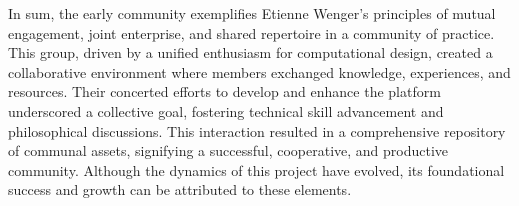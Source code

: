 In sum, the early community exemplifies Etienne Wenger’s principles of mutual engagement, joint enterprise, and shared repertoire in a community of practice. This group, driven by a unified enthusiasm for computational design, created a collaborative environment where members exchanged knowledge, experiences, and resources. Their concerted efforts to develop and enhance the  platform underscored a collective goal, fostering technical skill advancement and philosophical discussions. This interaction resulted in a comprehensive repository of communal assets, signifying a successful, cooperative, and productive community. Although the dynamics of this project have evolved, its foundational success and growth can be attributed to these elements.




%
%
%
%